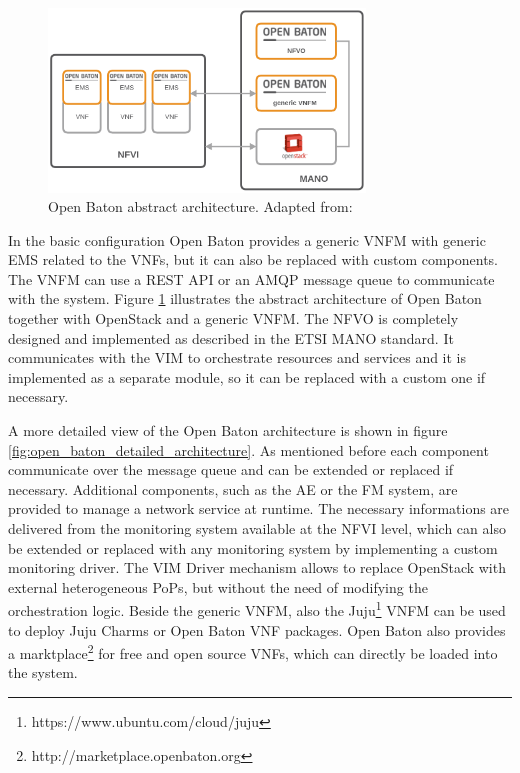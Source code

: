 \begin{figure}[H]
    \centering
    \includegraphics[width=0.75\textwidth]{resources/images/open_baton_simple_architecture.png}
    \caption[Open Baton abstract architecture]{Open Baton abstract architecture. Adapted from: \autocite{openBatonDoc}}
    \label{fig:open_baton_abstract_architecture}
\end{figure}

In the basic configuration Open Baton provides a generic \ac{VNFM} with generic \ac{EMS} related to the \acp{VNF}, but it can also be replaced with custom components.
The \ac{VNFM} can use a \ac{REST} \ac{API} or an \ac{AMQP} message queue to communicate with the system.
Figure \ref{fig:open_baton_abstract_architecture} illustrates the abstract architecture of Open Baton together with OpenStack and a generic \ac{VNFM}.
The \ac{NFVO} is completely designed and implemented as described in the \ac{ETSI} \ac{MANO} standard.\autocite{openBatonDoc}
It communicates with the \ac{VIM} to orchestrate resources and services and it is implemented as a separate module, so it can be replaced with a custom one if necessary.

A more detailed view of the Open Baton architecture is shown in figure \ref{fig:open_baton_detailed_architecture}.
As mentioned before each component communicate over the message queue and can be extended or replaced if necessary.
Additional components, such as the \ac{AE} or the \ac{FM} system, are provided to manage a network service at runtime.\autocite{openBatonDoc}
The necessary informations are delivered from the monitoring system available at the \ac{NFVI} level, which can also be extended or replaced with any monitoring system by implementing a custom monitoring driver.\autocite{openBatonDoc}
The \ac{VIM} Driver mechanism allows to replace OpenStack with external heterogeneous \acp{PoP}, but without the need of modifying the orchestration logic.\autocite{openBatonDoc}
Beside the generic \ac{VNFM}, also the Juju\footnote{https://www.ubuntu.com/cloud/juju} \ac{VNFM} can be used to deploy Juju Charms or Open Baton \ac{VNF} packages.
Open Baton also provides a marktplace\footnote{http://marketplace.openbaton.org} for free and open source \acp{VNF}, which can directly be loaded into the system.

